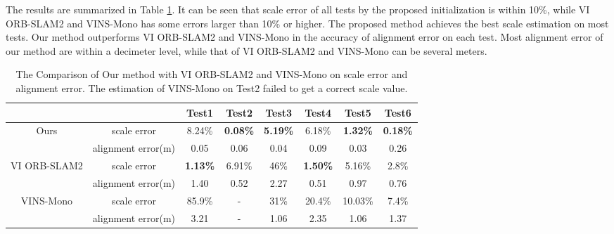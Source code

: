 \documentclass[journal,article,submit,moreauthors,pdftex]{Definitions/mdpi}
\begin{document}
The results are summarized in Table \ref{align}.
It can be seen that scale error of all tests by the proposed initialization 
is within 10\%, while VI ORB-SLAM2 and VINS-Mono has some errors larger than 
10\% or higher.
The proposed method achieves the best scale estimation on most tests.
Our method outperforms VI ORB-SLAM2 and VINS-Mono in the accuracy of alignment error on
each test.
Most alignment error of our method are within a decimeter level, while that of 
VI ORB-SLAM2 and VINS-Mono can be several meters.

\begin{table}[H]
	\caption{The Comparison of Our method with VI ORB-SLAM2 and 
		VINS-Mono on scale error and alignment error. 
	The estimation of VINS-Mono on Test2 failed to get a correct scale value.}
	\centering
	\begin{tabular}{cccccccc}
		\toprule
		                              &                    & Test1           & Test2           & Test3           & Test4           & Test5           & Test6           \\
		\midrule
		\multirow{2}{*}{Ours}         & scale error        & 8.24\%          & \textbf{0.08\%} & \textbf{5.19\%} & 6.18\%          & \textbf{1.32\%} & \textbf{0.18\%} \\
		\cline{2-8}
		                              & alignment error(m) & 0.05            & 0.06            & 0.04            & 0.09            & 0.03            & 0.26            \\
		\midrule
		\multirow{2}{*}{VI ORB-SLAM2} & scale error        & \textbf{1.13\%} & 6.91\%          & 46\%            & \textbf{1.50\%} & 5.16\%          & 2.8\%           \\
		\cline{2-8}
		                              & alignment error(m) & 1.40            & 0.52            & 2.27            & 0.51            & 0.97            & 0.76            \\
		\midrule
		\multirow{2}{*}{VINS-Mono}    & scale error        & 85.9\%          & -               & 31\%            & 20.4\%          & 10.03\%         & 7.4\%           \\
		\cline{2-8}
		                              & alignment error(m) & 3.21            & -               & 1.06            & 2.35            & 1.06            & 1.37            \\
		\bottomrule
	\end{tabular}
	\label{align}
\end{table}
\end{document}
